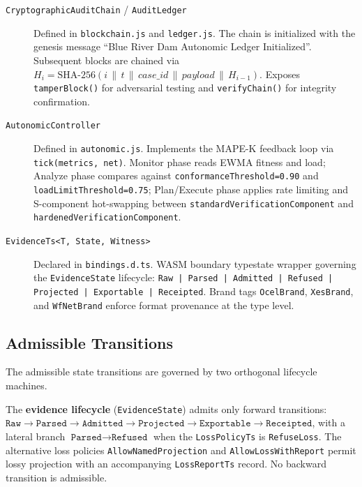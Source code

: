 \begin{description}
  \item[\texttt{CryptographicAuditChain} / \texttt{AuditLedger}] Defined in
        \texttt{blockchain.js} and \texttt{ledger.js}. The chain is initialized with the genesis
        message ``Blue River Dam Autonomic Ledger Initialized''. Subsequent blocks are chained via
        $H_i = \mathrm{SHA\text{-}256}(i \,\|\, t \,\|\, \mathit{case\_id} \,\|\, \mathit{payload} \,\|\, H_{i-1})$.
        Exposes \texttt{tamperBlock()} for adversarial testing and \texttt{verifyChain()} for
        integrity confirmation.

  \item[\texttt{AutonomicController}] Defined in \texttt{autonomic.js}. Implements the MAPE-K
        feedback loop via \texttt{tick(metrics, net)}. Monitor phase reads EWMA fitness and
        load; Analyze phase compares against \texttt{conformanceThreshold=0.90} and
        \texttt{loadLimitThreshold=0.75}; Plan/Execute phase applies rate limiting and
        S-component hot-swapping between \texttt{standardVerificationComponent} and
        \texttt{hardenedVerificationComponent}.

  \item[\texttt{EvidenceTs<T, State, Witness>}] Declared in \texttt{bindings.d.ts}. WASM
        boundary typestate wrapper governing the \texttt{EvidenceState} lifecycle:
        \texttt{Raw | Parsed | Admitted | Refused | Projected | Exportable | Receipted}.
        Brand tags \texttt{OcelBrand}, \texttt{XesBrand}, and \texttt{WfNetBrand} enforce
        format provenance at the type level.
\end{description}

\subsection{Admissible Transitions}
\label{sec:experiments-visualizer-arch-transitions}

The admissible state transitions are governed by two orthogonal lifecycle machines.

The \textbf{evidence lifecycle} (\texttt{EvidenceState}) admits only forward transitions:
$\texttt{Raw} \to \texttt{Parsed} \to \texttt{Admitted} \to \texttt{Projected} \to
\texttt{Exportable} \to \texttt{Receipted}$, with a lateral branch
$\texttt{Parsed} \to \texttt{Refused}$ when the \texttt{LossPolicyTs} is
\texttt{RefuseLoss}. The alternative loss policies \texttt{AllowNamedProjection} and
\texttt{AllowLossWithReport} permit lossy projection with an accompanying
\texttt{LossReportTs} record. No backward transition is admissible.


